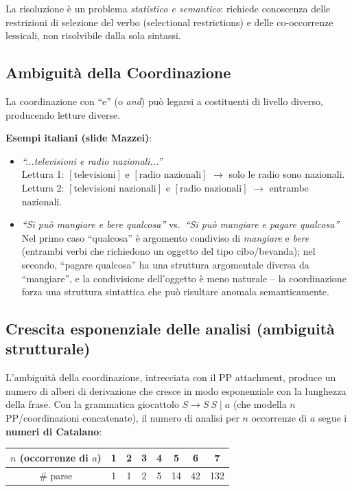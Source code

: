 \documentclass[12pt,a4paper]{article}
\begin{document}
La risoluzione è un problema \emph{statistico e semantico}: richiede conoscenza delle restrizioni di selezione del verbo (selectional restrictions) e delle co-occorrenze lessicali, non risolvibile dalla sola sintassi.

\subsection{Ambiguità della Coordinazione}

La coordinazione con ``e'' (o \emph{and}) può legarsi a costituenti di livello diverso, producendo letture diverse.

\textbf{Esempi italiani (slide Mazzei)}:
\begin{itemize}[leftmargin=1.5em]
  \item \textit{``...televisioni e radio nazionali...''}\\
    Lettura 1: $[\text{televisioni}]$ e $[\text{radio nazionali}]$ $\to$ solo le radio sono nazionali.\\
    Lettura 2: $[\text{televisioni nazionali}]$ e $[\text{radio nazionali}]$ $\to$ entrambe nazionali.
  \item \textit{``Si può mangiare e bere qualcosa''} vs.\ \textit{``Si può mangiare e pagare qualcosa''}\\
    Nel primo caso ``qualcosa'' è argomento condiviso di \emph{mangiare} e \emph{bere} (entrambi verbi che richiedono un oggetto del tipo cibo/bevanda); nel secondo, ``pagare qualcosa'' ha una struttura argomentale diversa da ``mangiare'', e la condivisione dell'oggetto è meno naturale -- la coordinazione forza una struttura sintattica che può risultare anomala semanticamente.
\end{itemize}

\subsection{Crescita esponenziale delle analisi (ambiguità strutturale)}

L'ambiguità della coordinazione, intrecciata con il PP attachment, produce un numero di alberi di derivazione che cresce in modo esponenziale con la lunghezza della frase. Con la grammatica giocattolo $S \to S\ S \mid a$ (che modella $n$ PP/coordinazioni concatenate), il numero di analisi per $n$ occorrenze di $a$ segue i \textbf{numeri di Catalano}:

\begin{center}
\begin{tabular}{cccccccc}
\toprule
$n$ (occorrenze di $a$) & 1 & 2 & 3 & 4 & 5 & 6 & 7 \\
\midrule
\# parse & 1 & 1 & 2 & 5 & 14 & 42 & 132 \\
\bottomrule
\end{tabular}
\end{center}
\end{document}
